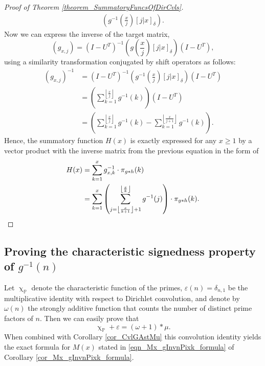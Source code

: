 \documentclass[11pt,reqno,a4letter]{article}
\numberwithin{figure}{section}
\numberwithin{table}{section}
\newcommand{\Iverson}[1]{\ensuremath{\left[#1\right]_{\delta}}}
\newcommand{\floor}[1]{\left\lfloor #1 \right\rfloor}
\renewcommand{\chi}{\upchi}
\theoremstyle{plain}
\numberwithin{theorem}{section}
\theoremstyle{definition}
\begin{document}
\begin{proof}[Proof of Theorem \ref{theorem_SummatoryFuncsOfDirCvls}]
\begin{align*}
     \left(g^{-1}\left(\frac{x}{j}\right) \Iverson{j|x}\right). 
\end{align*} 
Now we can express the inverse of the target matrix, 
$$(g_{x,j}) = (I-U^{T})^{-1} \left(g\left(\frac{x}{j}\right) \Iverson{j|x}\right) (I-U^{T}),$$
using a similarity transformation conjugated by shift operators as follows: 
\begin{align*} 
(g_{x,j})^{-1} & = (I-U^{T})^{-1} \left(g^{-1}\left(\frac{x}{j}\right) \Iverson{j|x}\right) (I-U^{T}) \\ 
     & = \left(\sum_{k=1}^{\floor{\frac{x}{j}}} g^{-1}(k)\right) (I-U^{T}) \\ 
     & = \left(\sum_{k=1}^{\floor{\frac{x}{j}}} g^{-1}(k) - \sum_{k=1}^{\floor{\frac{x}{j+1}}} g^{-1}(k)\right). 
\end{align*} 
Hence, the summatory function $H(x)$ is exactly expressed for any $x \geq 1$ 
by a vector product with the inverse matrix from the previous equation in the form of 
\begin{align*} 
H(x) & = \sum_{k=1}^x g_{x,k}^{-1} \cdot \pi_{g \ast h}(k) \\ 
     & = \sum_{k=1}^x \left(\sum_{j=\floor{\frac{x}{k+1}}+1}^{\floor{\frac{x}{k}}} g^{-1}(j)\right) \cdot \pi_{g \ast h}(k). 
     \qedhere
\end{align*} 
\end{proof} 

\subsection{Proving the characteristic signedness property of $g^{-1}(n)$} 

Let $\chi_{\mathbb{P}}$ denote the characteristic function of the primes, 
$\varepsilon(n) = \delta_{n,1}$ be the multiplicative identity with respect to Dirichlet convolution, 
and denote by $\omega(n)$ the strongly additive function that counts the number of 
distinct prime factors of $n$. Then we can easily prove that 
\begin{equation}
\label{eqn_AntiqueDivisorSumIdent} 
\chi_{\mathbb{P}} + \varepsilon = (\omega + 1) \ast \mu. 
\end{equation} 
When combined with Corollary \ref{cor_CvlGAstMu} 
this convolution identity yields the exact 
formula for $M(x)$ stated in \eqref{eqn_Mx_gInvnPixk_formula} of 
Corollary \ref{cor_Mx_gInvnPixk_formula}. 
\end{document}
